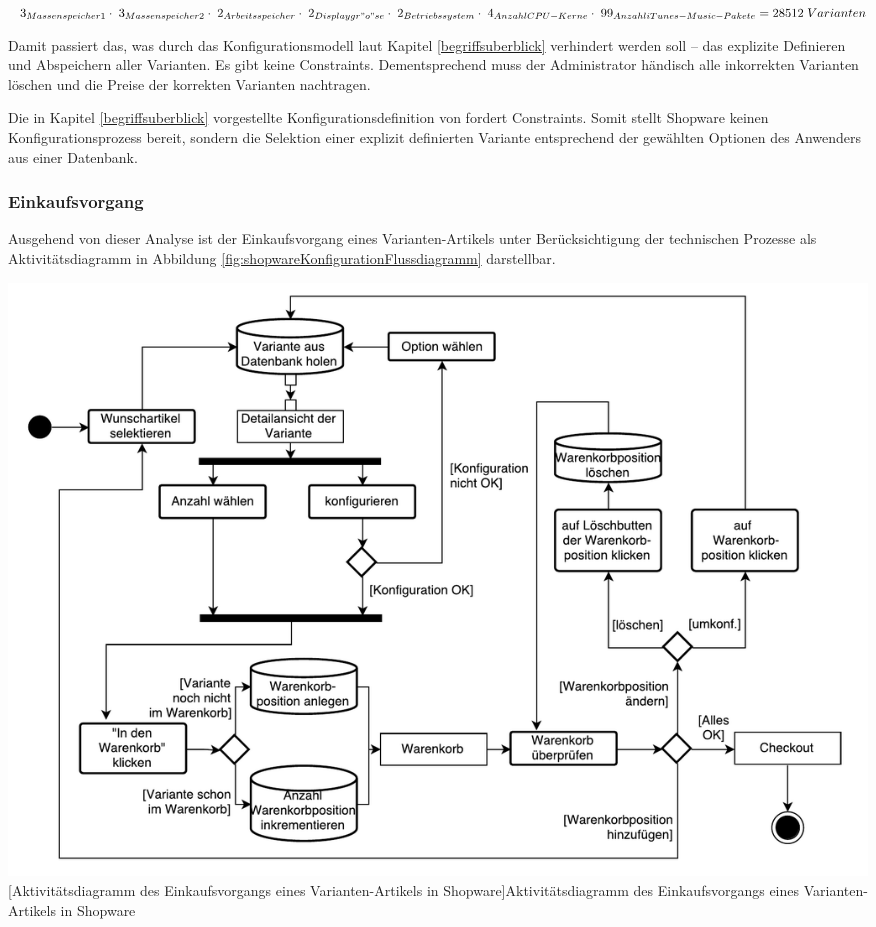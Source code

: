 \documentclass[11pt, a4paper, titlepage, listof=totoc, bibliography=totoc, index=totoc, twoside, openright, headings=normal]{scrreprt}
\begin{document}
\begin{addmargin}[40pt]{0pt} 
$\;\;\;3_{Massenspeicher1}\\\cdot\;3_{Massenspeicher2}\\\cdot\;2_{Arbeitsspeicher}\\\cdot\;2_{Displaygr"o"se}\\\cdot\;2_{Betriebssystem}\\\cdot\;4_{Anzahl CPU-Kerne}\\\cdot\;99_{Anzahl iTunes-Music-Pakete}\\= 28512\;Varianten$
\end{addmargin}

Damit passiert das, was durch das Konfigurationsmodell laut Kapitel \ref{begriffsuberblick} verhindert werden soll -- das explizite Definieren und Abspeichern aller Varianten. Es gibt keine Constraints. Dementsprechend muss der Administrator händisch alle inkorrekten Varianten löschen und die Preise der korrekten Varianten nachtragen.

Die in Kapitel \ref{begriffsuberblick} vorgestellte Konfigurationsdefinition von \citet{sabin98} fordert Constraints. Somit stellt Shopware keinen Konfigurationsprozess bereit, sondern die Selektion einer explizit definierten Variante entsprechend der gewählten Optionen des Anwenders aus einer Datenbank.

\subsubsection{Einkaufsvorgang}
\label{shopwareEinkaufsvorgang}
Ausgehend von dieser Analyse ist der Einkaufsvorgang eines Varianten-Artikels unter Berücksichtigung der technischen Prozesse als Aktivitätsdiagramm in Abbildung \ref{fig:shopwareKonfigurationFlussdiagramm} darstellbar.

\vspace{1em}
\begin{minipage}{\linewidth}
	\centering
	\includegraphics[width=1\linewidth]{Abbildungen/shopwareKonfigurationFlussdiagramm.pdf}
	[Aktivitätsdiagramm des Einkaufsvorgangs eines Varianten-Artikels in Shopware]{Aktivitätsdiagramm des Einkaufsvorgangs eines Varianten-Artikels in Shopware}
	\label{fig:shopwareKonfigurationFlussdiagramm}
\end{minipage}
\vspace{0.3em}
\end{document}
